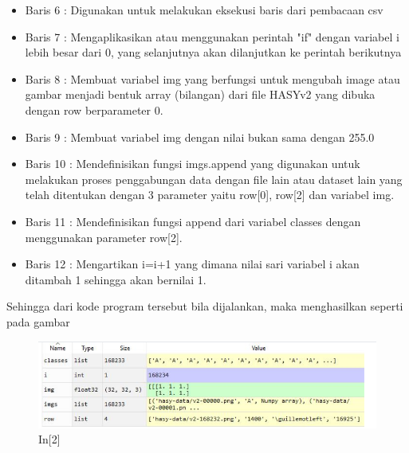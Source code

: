 \begin{enumerate}
\begin{itemize}
\item Baris 6	: Digunakan untuk melakukan eksekusi baris dari pembacaan csv 
\item Baris 7	: Mengaplikasikan atau menggunakan perintah "if" dengan variabel i lebih besar dari 0, yang selanjutnya akan dilanjutkan ke perintah berikutnya
\item Baris 8	: Membuat variabel img yang berfungsi untuk mengubah image atau gambar menjadi bentuk array (bilangan) dari file HASYv2 yang dibuka dengan row berparameter 0.
\item Baris 9	: Membuat variabel img dengan nilai bukan sama dengan 255.0
\item Baris 10 : Mendefinisikan fungsi imgs.append yang digunakan untuk melakukan proses penggabungan data dengan file lain atau dataset lain yang telah ditentukan dengan 3 parameter yaitu row[0], row[2] dan variabel img.
\item Baris 11 : Mendefinisikan fungsi append dari variabel classes dengan menggunakan parameter row[2].
\item Baris 12 : Mengartikan i=i+1 yang dimana nilai sari variabel i akan ditambah 1 sehingga akan bernilai 1.
\end{itemize}
\par Sehingga dari kode program tersebut bila dijalankan, maka menghasilkan seperti pada gambar 
\begin{figure}[!htbp]
	\centerline{\includegraphics[width=1\textwidth]{figures/andi/p2.PNG}}
	\caption{In[2]}
	

\end{figure}
\end{enumerate}
